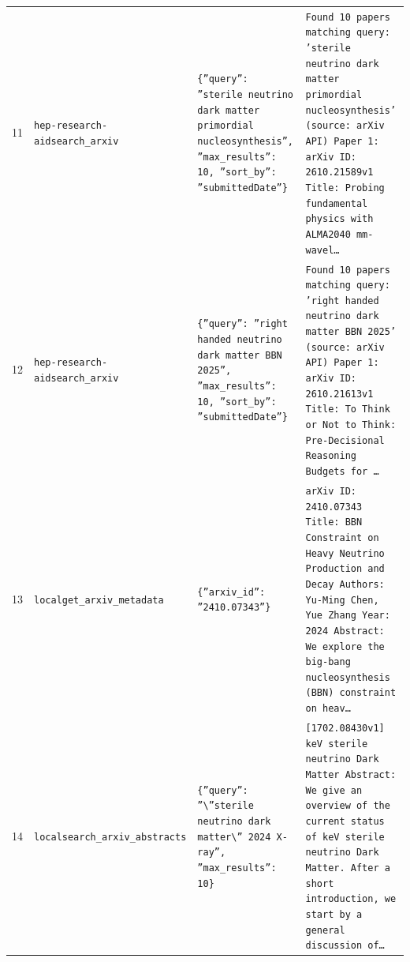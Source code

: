 \documentclass[11pt,a4paper]{article}
\begin{document}
\begin{longtable}{@{}p{}p{}p{}p{}@{}}
11 & \texttt{hep-research-aid}\newline\texttt{search\_\allowbreak{}arxiv} & \texttt{\{''query'':\allowbreak{} ''sterile neutrino dark matter primordial nucleosynthesis'',\allowbreak{} ''max\_\allowbreak{}results'':\allowbreak{} 10,\allowbreak{} ''sort\_\allowbreak{}by'':\allowbreak{} ''submittedDate''\}\allowbreak{}} & \texttt{Found 10 papers matching query:\allowbreak{} 'sterile neutrino dark matter primordial nucleosynthesis' (source:\allowbreak{} arXiv API)\allowbreak{}  Paper 1:\allowbreak{} arXiv ID:\allowbreak{} 2610.21589v1 Title:\allowbreak{} Probing fundamental physics with ALMA2040 mm-wavel\ldots{}\allowbreak{}} \\
12 & \texttt{hep-research-aid}\newline\texttt{search\_\allowbreak{}arxiv} & \texttt{\{''query'':\allowbreak{} ''right handed neutrino dark matter BBN 2025'',\allowbreak{} ''max\_\allowbreak{}results'':\allowbreak{} 10,\allowbreak{} ''sort\_\allowbreak{}by'':\allowbreak{} ''submittedDate''\}\allowbreak{}} & \texttt{Found 10 papers matching query:\allowbreak{} 'right handed neutrino dark matter BBN 2025' (source:\allowbreak{} arXiv API)\allowbreak{}  Paper 1:\allowbreak{} arXiv ID:\allowbreak{} 2610.21613v1 Title:\allowbreak{} To Think or Not to Think:\allowbreak{} Pre-Decisional Reasoning Budgets for \ldots{}\allowbreak{}} \\
13 & \texttt{local}\newline\texttt{get\_\allowbreak{}arxiv\_\allowbreak{}metadata} & \texttt{\{''arxiv\_\allowbreak{}id'':\allowbreak{} ''2410.07343''\}\allowbreak{}} & \texttt{arXiv ID:\allowbreak{} 2410.07343 Title:\allowbreak{} BBN Constraint on Heavy Neutrino Production and Decay Authors:\allowbreak{} Yu-Ming Chen,\allowbreak{} Yue Zhang Year:\allowbreak{} 2024 Abstract:\allowbreak{} We explore the big-bang nucleosynthesis (BBN)\allowbreak{} constraint on heav\ldots{}\allowbreak{}} \\
14 & \texttt{local}\newline\texttt{search\_\allowbreak{}arxiv\_\allowbreak{}abstracts} & \texttt{\{''query'':\allowbreak{} ''\textbackslash{}\allowbreak{}''sterile neutrino dark matter\textbackslash{}\allowbreak{}'' 2024 X-ray'',\allowbreak{} ''max\_\allowbreak{}results'':\allowbreak{} 10\}\allowbreak{}} & \texttt{[1702.08430v1]\allowbreak{} keV sterile neutrino Dark Matter Abstract:\allowbreak{} We give an overview of the current status of keV sterile neutrino Dark Matter. After a short introduction,\allowbreak{} we start by a general discussion of\ldots{}\allowbreak{}} \\

\end{longtable}
\end{document}

